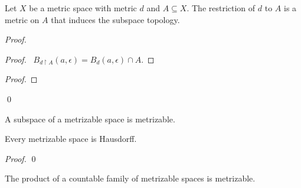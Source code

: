 \begin{proposition}
    Let $X$ be a metric space with metric $d$ and $A \subseteq X$. The restriction of $d$ to $A$ is a metric on $A$ that induces the subspace topology.
\end{proposition}

\begin{proof}
    \pf
    \begin{proof}
        \pf\ $B_{d \restriction A}(a, \epsilon) = B_d(a, \epsilon) \cap A$.
    \end{proof}
    \begin{proof}
    \end{proof}
    \qed
\end{proof}

\begin{corollary}
    A subspace of a metrizable space is metrizable.
\end{corollary}

\begin{proposition}
    Every metrizable space is Hausdorff.
\end{proposition}

\begin{proof}
    \pf
    \qed
\end{proof}

\begin{proposition}[CC]
    The product of a countable family of metrizable spaces is metrizable.
\end{proposition}

